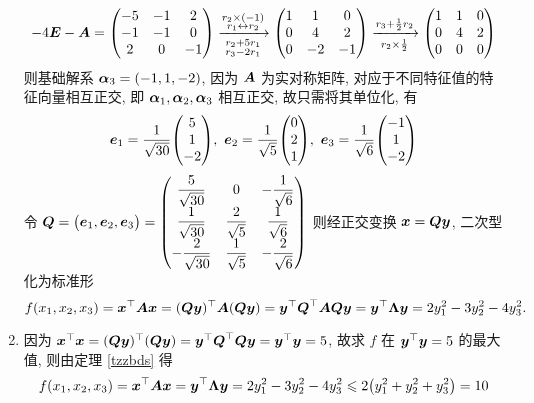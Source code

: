 \begin{solution}
\begin{enumerate}[label=(\arabic{*})]
              $$-4\vb*{E}-\vb*{A}=\mqty(-5&-1&2\\-1&-1&0\\2&0&-1)\xrightarrow[\substack{r_2+5r_1\\r_3-2r_1}]{\substack{r_2\times(-1)\\r_1\leftrightarrow r_2}}\mqty(1&1&0\\0&4&2\\0&-2&-1)\xrightarrow[r_2\times\frac{1}{2}]{r_3+\frac{1}{2}r_2}\mqty(1&1&0\\0&4&2\\0&0&0)$$
              则基础解系 $\vb*{\alpha}_3=(-1,1,-2)$, 因为 $\vb*{A}$ 为实对称矩阵, 对应于不同特征值的特征向量相互正交, 即 $\vb*{\alpha}_1,\vb*{\alpha}_2,\vb*{\alpha}_3$ 相互正交, 故只需将其单位化, 有
              $$\vb*{e}_1=\dfrac{1}{\sqrt{30}}\mqty(5\\1\\-2),~\vb*{e}_2=\dfrac{1}{\sqrt{5}}\mqty(0\\2\\1),~\vb*{e}_3=\dfrac{1}{\sqrt{6}}\mqty(-1\\1\\-2)$$
              令 $\vb*{Q}=\mqty(\vb*{e}_1,\vb*{e}_2,\vb*{e}_3)=\mqty(\dfrac{5}{\sqrt{30}}&0&-\dfrac{1}{\sqrt{6}}\\[6pt]
                  \dfrac{1}{\sqrt{30}}&\dfrac{2}{\sqrt{5}}&\dfrac{1}{\sqrt{6}}\\[6pt]
                  -\dfrac{2}{\sqrt{30}} & \dfrac{1}{\sqrt{5}} & -\dfrac{2}{\sqrt{6}}
                  )$ 则经正交变换 $\vb*{x}=\vb*{Qy}$, 二次型化为标准形 $$f(x_1,x_2,x_3)=\vb*{x}^\top\vb*{Ax}=(\vb*{Qy})^\top\vb*{A}(\vb*{Qy})=\vb*{y}^\top\vb*{Q}^\top\vb*{AQy}=\vb*{y}^\top\vb*{\Lambda y}=2y_1^2-3y_2^2-4y_3^2.$$
        \item 因为 $\vb*{x}^\top\vb*{x}=(\vb*{Qy})^\top(\vb*{Qy})=\vb*{y}^\top\vb*{Q}^\top\vb*{Qy}=\vb*{y}^\top\vb*{y}=5$, 故求 $f$ 在 $\vb*{y}^\top\vb*{y}=5$ 的最大值, 则由定理 \ref{tzzbds} 得
              $$f(x_1,x_2,x_3)=\vb*{x}^\top\vb*{Ax}=\vb*{y}^\top\vb*{\Lambda y}=2y_1^2-3y_2^2-4y_3^2\leqslant 2\qty(y_1^2+y_2^2+y_3^2)=10$$
    \end{enumerate}
\end{solution}

